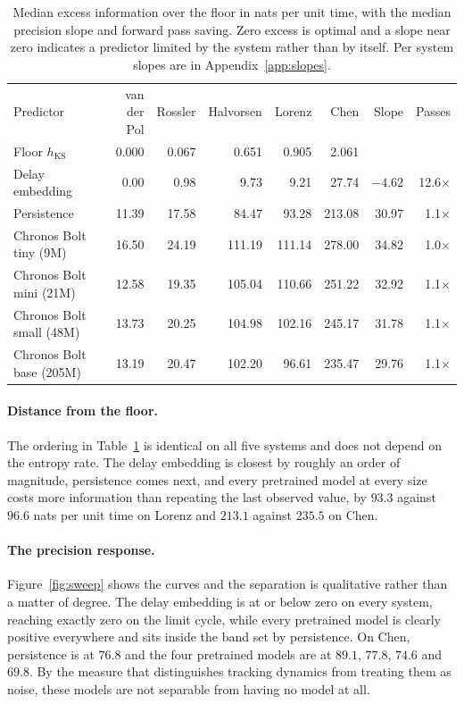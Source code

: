 \documentclass{article}
\begin{document}
\begin{table}[t]
  \centering
  \caption{Median excess information over the floor in nats per unit time, with the median precision slope and forward pass saving. Zero excess is optimal and a slope near zero indicates a predictor limited by the system rather than by itself. Per system slopes are in Appendix~\ref{app:slopes}.}
  \label{tab:main}
  \small
  \setlength{\tabcolsep}{4.5pt}
  \begin{tabular}{lrrrrrrr}
    \toprule
    Predictor & van der Pol & Rossler & Halvorsen & Lorenz & Chen & Slope & Passes \\
    Floor $h_{\mathrm{KS}}$ & 0.000 & 0.067 & 0.651 & 0.905 & 2.061 & & \\
    \midrule
    Delay embedding        & \phantom{0}0.00 & \phantom{0}0.98 & \phantom{00}9.73 & \phantom{00}9.21 & \phantom{0}27.74 & $-4.62$ & 12.6$\times$ \\
    Persistence            & 11.39 & 17.58 & \phantom{0}84.47 & \phantom{0}93.28 & 213.08 & 30.97 & 1.1$\times$ \\
    Chronos Bolt tiny (9M)    & 16.50 & 24.19 & 111.19 & 111.14 & 278.00 & 34.82 & 1.0$\times$ \\
    Chronos Bolt mini (21M)   & 12.58 & 19.35 & 105.04 & 110.66 & 251.22 & 32.92 & 1.1$\times$ \\
    Chronos Bolt small (48M)  & 13.73 & 20.25 & 104.98 & 102.16 & 245.17 & 31.78 & 1.1$\times$ \\
    Chronos Bolt base (205M)  & 13.19 & 20.47 & 102.20 & \phantom{0}96.61 & 235.47 & 29.76 & 1.1$\times$ \\
    \bottomrule
  \end{tabular}
\end{table}

\paragraph{Distance from the floor.}
The ordering in Table~\ref{tab:main} is identical on all five systems and does not depend on the entropy rate. The delay embedding is closest by roughly an order of magnitude, persistence comes next, and every pretrained model at every size costs more information than repeating the last observed value, by $93.3$ against $96.6$ nats per unit time on Lorenz and $213.1$ against $235.5$ on Chen.

\paragraph{The precision response.}
Figure~\ref{fig:sweep} shows the curves and the separation is qualitative rather than a matter of degree. The delay embedding is at or below zero on every system, reaching exactly zero on the limit cycle, while every pretrained model is clearly positive everywhere and sits inside the band set by persistence. On Chen, persistence is at $76.8$ and the four pretrained models are at $89.1$, $77.8$, $74.6$ and $69.8$. By the measure that distinguishes tracking dynamics from treating them as noise, these models are not separable from having no model at all.
\end{document}
